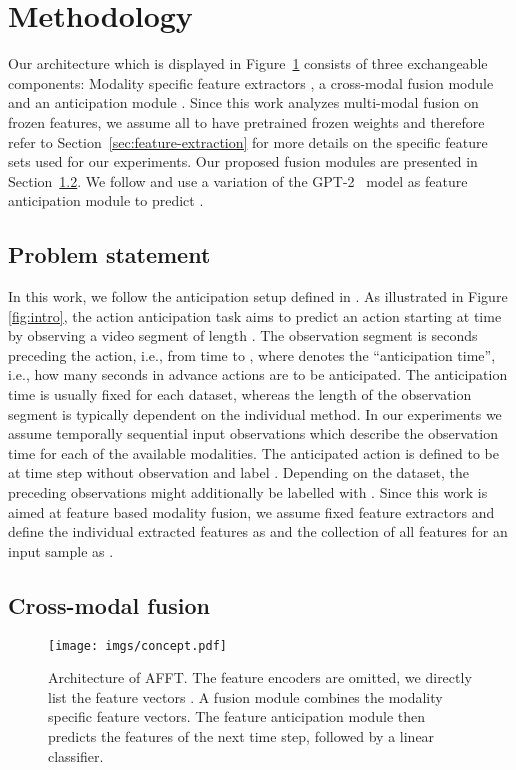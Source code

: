 \documentclass[10pt,twocolumn,letterpaper,dvipsnames]{article}
\newcommand{\sname}{AFFT}
\begin{document}
 \section{Methodology}
Our architecture which is displayed in Figure~\ref{fig:arch} consists of three exchangeable components: Modality specific feature extractors , a cross-modal fusion module  and an anticipation module . Since this work analyzes multi-modal fusion on frozen features, we assume all  to have pretrained frozen weights and therefore refer to Section~\ref{sec:feature-extraction} for more details on the specific feature sets used for our experiments. Our proposed fusion modules are presented in Section~\ref{sec:fusion-module}. We follow \cite{girdharAnticipativeVideoTransformer2021} and use a variation of the GPT-2~\cite{radford2019language} model as feature anticipation module to predict .

\subsection{Problem statement}
In this work, we follow the anticipation setup defined in \cite{damen2018scaling,damen2020epic}. As illustrated in Figure \ref{fig:intro}, the action anticipation task aims to predict an action starting at time  by observing a video segment of length . The observation segment is  seconds preceding the action, i.e., from time    to   ,  where  denotes the ``anticipation time'', i.e., how many seconds in advance actions are to be anticipated. The anticipation time  is usually fixed for each dataset, whereas the length of the observation segment is typically dependent on the individual method. In our experiments we assume  temporally sequential input  observations  which describe the observation time  for each of the  available modalities. The anticipated action is defined to be at time step  without observation and label . Depending on the dataset, the preceding observations might additionally be labelled with . Since this work is aimed at feature based modality fusion, we assume fixed feature extractors  and define the individual extracted features as  and the collection of all  features for an input sample as . 

\subsection{Cross-modal fusion}
\label{sec:fusion-module}
\begin{figure}[t]
  \texttt{[image: imgs/concept.pdf]}
  \caption{Architecture of \sname. The feature encoders are omitted, we directly list the feature vectors . A fusion module combines the modality specific feature vectors. The feature anticipation module then predicts the features of the next time step, followed by a linear classifier.}
\label{fig:arch}
\end{figure}
\end{document}
